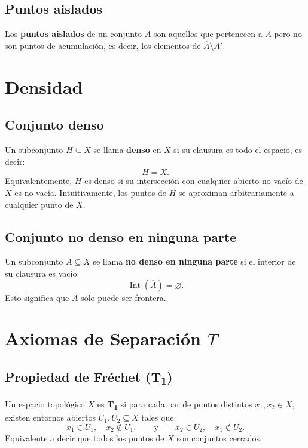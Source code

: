 \documentclass[12pt]{article}
\begin{document}
\subsection*{Puntos aislados}
\begin{tcolorbox}[definitionstyle]
Los \textbf{puntos aislados} de un conjunto \( A \) son aquellos que pertenecen a \( \overline{A} \) pero no son puntos de acumulación, es decir, los elementos de \( \overline{A} \setminus A' \).
\end{tcolorbox}
\section*{Densidad}
\subsection*{Conjunto denso}
\begin{tcolorbox}[definitionstyle]
Un subconjunto \( H \subseteq X \) se llama \textbf{denso} en \( X \) si su clausura es todo el espacio, es decir:
\[
\overline{H} = X.
\]
Equivalentemente, \( H \) es denso si su intersección con cualquier abierto no vacío de \( X \) es no vacía.  
Intuitivamente, los puntos de \( H \) se aproximan arbitrariamente a cualquier punto de \( X \).
\end{tcolorbox}
\subsection*{Conjunto no denso en ninguna parte}
\begin{tcolorbox}[definitionstyle]
Un subconjunto \( A \subseteq X \) se llama \textbf{no denso en ninguna parte} si el interior de su clausura es vacío:
\[
\operatorname{Int}(\overline{A}) = \varnothing.
\]
Esto significa que \( A \) sólo puede ser frontera.
\end{tcolorbox}
\section*{Axiomas de Separación $T$}
\begin{tcolorbox}[definitionstyle]
\subsection*{Propiedad de Fréchet (T\textsubscript{1})}
Un espacio topológico \( X \) es \textbf{T\textsubscript{1}} si para cada par de puntos distintos \( x_1, x_2 \in X \),  
existen entornos abiertos \( U_1, U_2 \subseteq X \) tales que:
\[
x_1 \in U_1, \quad x_2 \notin U_1, \qquad \text{y} \qquad x_2 \in U_2, \quad x_1 \notin U_2.
\]
Equivalente a decir que todos los puntos de \( X \) son conjuntos cerrados.
\end{tcolorbox}
\end{document}
